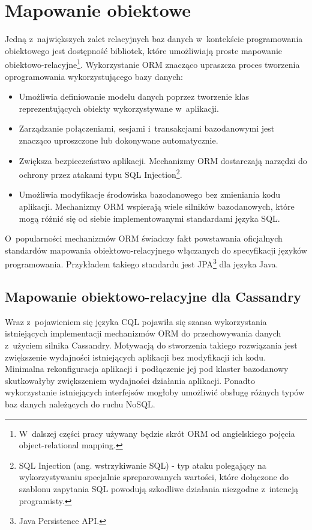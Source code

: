 
\chapter{Mapowanie obiektowe}

Jedną z~największych zalet relacyjnych baz danych w~kontekście programowania obiektowego jest dostępność bibliotek, które umożliwiają proste mapowanie obiektowo-relacyjne\footnote{W~dalszej części pracy używany będzie skrót ORM od angielskiego pojęcia object-relational mapping.}. Wykorzystanie ORM znacząco upraszcza proces tworzenia oprogramowania wykorzystującego bazy danych:

\begin{itemize}
	\item Umożliwia definiowanie modelu danych poprzez tworzenie klas reprezentujących obiekty wykorzystywane w~aplikacji.
	\item Zarządzanie połączeniami, sesjami i~transakcjami bazodanowymi jest znacząco uproszczone lub dokonywane automatycznie.
	\item Zwiększa bezpieczeństwo aplikacji. Mechanizmy ORM dostarczają narzędzi do ochrony przez atakami typu SQL Injection\footnote{SQL Injection (ang. wstrzykiwanie SQL) - typ ataku polegający na wykorzystywaniu specjalnie spreparowanych wartości, które dołączone do szablonu zapytania SQL powodują szkodliwe działania niezgodne z~intencją programisty.}.~\cite{orm_sql_injection_protection}
	\item Umożliwia modyfikacje środowiska bazodanowego bez zmieniania kodu aplikacji. Mechanizmy ORM wspierają wiele silników bazodanowych, które mogą różnić się od siebie implementowanymi standardami języka SQL. 
\end{itemize}

O~popularności mechanizmów ORM świadczy fakt powstawania oficjalnych standardów mapowania obiektowo-relacyjnego włączanych do specyfikacji języków programowania. Przykładem takiego standardu jest JPA\footnote{Java Persistence API.} dla języka Java.

\section{Mapowanie obiektowo-relacyjne dla Cassandry}

Wraz z~pojawieniem się języka CQL pojawiła się szansa wykorzystania istniejących implementacji mechanizmów ORM do przechowywania danych z~użyciem silnika Cassandry. Motywacją do stworzenia takiego rozwiązania jest zwiększenie wydajności istniejących aplikacji bez modyfikacji ich kodu. Minimalna rekonfiguracja aplikacji i~podłączenie jej pod klaster bazodanowy skutkowałyby zwiększeniem wydajności działania aplikacji. Ponadto wykorzystanie istniejących interfejsów mogłoby umożliwić obsługę różnych typów baz danych należących do ruchu NoSQL. 

